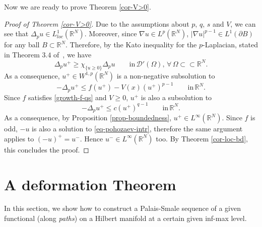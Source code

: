 \documentclass[11pt,reqno]{amsart}
\newtheorem{corollary}[theorem]{Corollary}
\theoremstyle{definition}
\numberwithin{equation}{section}
\numberwithin{theorem}{section}
\numberwithin{equation}{section}
\numberwithin{theorem}{section}
\newcommand{\R}{\mathbb{R}}
\begin{document}
Now we are ready to prove Theorem \ref{cor-V>0}.
\begin{proof}[Proof of Theorem \ref{cor-V>0}]
Due to the assumptions about $p,\,q,\,s$ and $V$, we can see that $\Delta_p u\in L^1_{loc}(\R^N)$. Moreover, since $\nabla u\in L^p(\R^N)$, $|\nabla u|^{p-1}\in L^1(\partial B)$ for any ball $B\subset\R^N$. Therefore, by the Kato inequality for the $p$-Laplacian, stated in Theorem $3.4$ of~\cite{HORIUCHI2021}, we have $$\Delta_p u^+\ge \chi_{\{u\ge 0\}}\Delta_p u\qquad\text{in}\,\mathcal{D}'(\Omega),\,\forall\,\Omega\subset\subset\R^N.$$
As a consequence, $u^+\in W^{1,p}(\R^N)$ is a non-negative subsolution to $$-\Delta_p u^+\le f(u^+)-V(x)(u^+)^{p-1}\qquad\text{in}\,\R^N.$$ 
Since $f$ satisfies \eqref{growth-f-qs} and $V\ge 0$, $u^+$ is also a subsolution to
$$-\Delta_p u^+\le c(u^+)^{q-1}\qquad\text{in}\,\R^N.$$
As a consequence, by Proposition \ref{prop-boundedness}, $u^+\in L^\infty(\R^N)$. Since $f$ is odd, $-u$ is also a solution to \eqref{eq-pohozaev-intr}, therefore the same argument applies to $(-u)^+=u^-$. Hence $u^-\in L^\infty(\R^N)$ too. By Theorem \ref{cor-loc-bd}, this concludes the proof.
\end{proof}


\section{A deformation Theorem}\label{sec-defo}
In this section, we show how to construct a Palais-Smale sequence of a given functional (along {\em paths})  on a Hilbert manifold at a certain given inf-max level.\\
\end{document}
